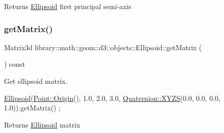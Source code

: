 \begin{DoxyReturn}{Returns}
\hyperlink{classlibrary_1_1math_1_1geom_1_1d3_1_1objects_1_1_ellipsoid}{Ellipsoid} first principal semi-\/axis 
\end{DoxyReturn}
\mbox{\label{classlibrary_1_1math_1_1geom_1_1d3_1_1objects_1_1_ellipsoid_ae6af9f16762e8c38b0a71c306d29ddbf}} 
\subsubsection{\texorpdfstring{get\+Matrix()}{getMatrix()}}
{\footnotesize\ttfamily Matrix3d library\+::math\+::geom\+::d3\+::objects\+::\+Ellipsoid\+::get\+Matrix (\begin{DoxyParamCaption}{ }\end{DoxyParamCaption}) const}



Get ellipsoid matrix. 


\begin{DoxyCode}
\hyperlink{classlibrary_1_1math_1_1geom_1_1d3_1_1objects_1_1_ellipsoid_aae81fe0edc7f0e8d4590ea89ae73cb14}{Ellipsoid}(\hyperlink{classlibrary_1_1math_1_1geom_1_1d3_1_1objects_1_1_point_ab2a38e285c562e50bf350272c083986f}{Point::Origin}(), 1.0, 2.0, 3.0, \hyperlink{classlibrary_1_1math_1_1geom_1_1d3_1_1trf_1_1rot_1_1_quaternion_a006294eb483bcfc352c2dc36cf19ceec}{Quaternion::XYZS}(0.0, 0.0, 
      0.0, 1.0)).getMatrix() ;
\end{DoxyCode}


\begin{DoxyReturn}{Returns}
\hyperlink{classlibrary_1_1math_1_1geom_1_1d3_1_1objects_1_1_ellipsoid}{Ellipsoid} matrix 
\end{DoxyReturn}
\mbox{\label{classlibrary_1_1math_1_1geom_1_1d3_1_1objects_1_1_ellipsoid_a8d426da587827eff577de4edb58ae417}} 
